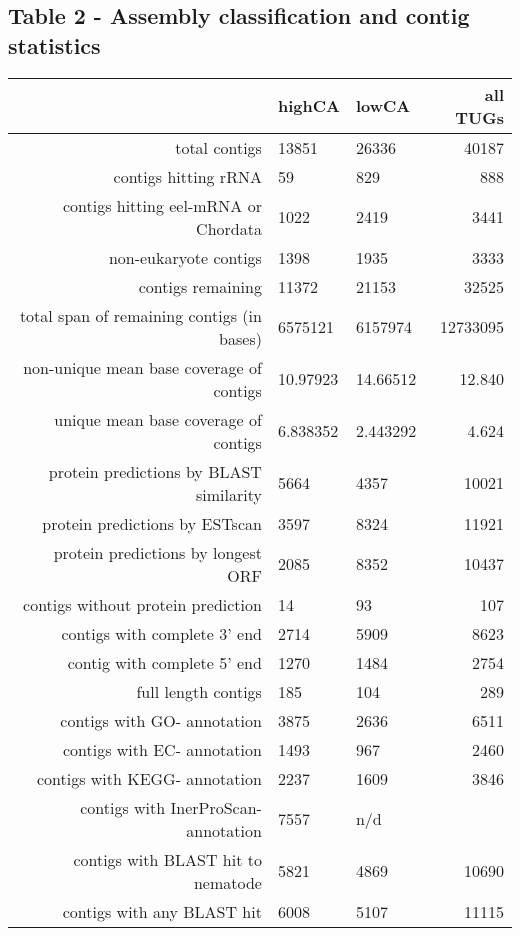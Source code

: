 \documentclass[10pt]{bmc_article}
\newenvironment{bmcformat}{\begin{raggedright}\baselineskip20pt\sloppy\setboolean{publ}{false}}{\end{raggedright}\baselineskip20pt\sloppy}
\begin{document}
\begin{bmcformat}
\subsection*{Table 2 - Assembly classification and contig statistics}

\begin{table}[ht]
\begin{center}
\begin{tabular}{rllr}
  \hline
 & highCA & lowCA & all TUGs \\ 
  \hline
total contigs & 13851 & 26336 & 40187 \\ 
  contigs hitting rRNA &  59 & 829 & 888 \\ 
  contigs hitting eel-mRNA or Chordata & 1022 & 2419 & 3441 \\ 
  non-eukaryote contigs & 1398 & 1935 & 3333 \\ 
  contigs remaining & 11372 & 21153 & 32525 \\ 
  total span of remaining contigs (in bases) & 6575121 & 6157974 & 12733095 \\ 
  non-unique mean base coverage of contigs & 10.97923 & 14.66512 & 12.840 \\ 
  unique mean base coverage of contigs & 6.838352 & 2.443292 & 4.624 \\ 
  protein predictions by BLAST similarity & 5664 & 4357 & 10021 \\ 
  protein predictions by ESTscan & 3597 & 8324 & 11921 \\ 
  protein predictions by longest ORF & 2085 & 8352 & 10437 \\ 
  contigs without protein prediction &   14 &   93 & 107 \\ 
  contigs with complete 3' end & 2714 & 5909 & 8623 \\ 
  contig with complete 5' end & 1270 & 1484 & 2754 \\ 
  full length contigs & 185 & 104 & 289 \\ 
  contigs with GO- annotation & 3875 & 2636 & 6511 \\ 
  contigs with EC- annotation & 1493 &  967 & 2460 \\ 
  contigs with KEGG- annotation & 2237 & 1609 & 3846 \\ 
  contigs with InerProScan- annotation & 7557 & n/d &  \\ 
  contigs with BLAST hit to nematode & 5821 & 4869 & 10690 \\ 
  contigs with any BLAST hit & 6008 & 5107 & 11115 \\ 
   \hline
\end{tabular}
\end{center}
\end{table}
\newpage


\end{bmcformat}
\end{document}
